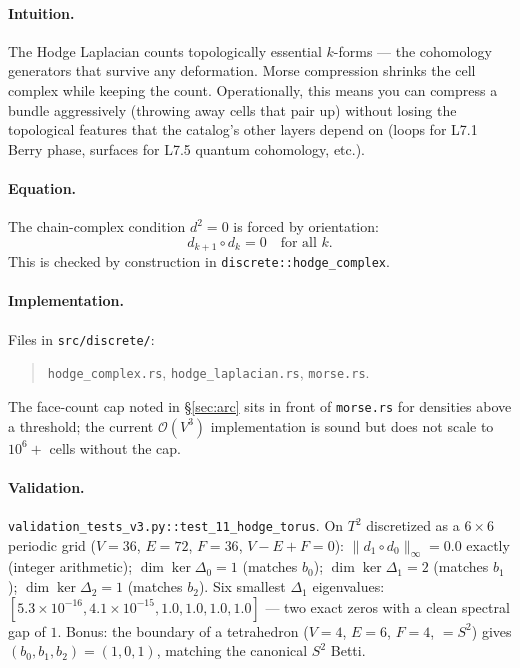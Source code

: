 \documentclass[11pt,letterpaper]{article}
\begin{document}
\paragraph{Intuition.}
The Hodge Laplacian counts topologically essential $k$-forms ---
the cohomology generators that survive any deformation. Morse
compression shrinks the cell complex while keeping the count.
Operationally, this means you can compress a bundle aggressively
(throwing away cells that pair up) without losing the topological
features that the catalog's other layers depend on (loops for L7.1
Berry phase, surfaces for L7.5 quantum cohomology, etc.).

\paragraph{Equation.}
The chain-complex condition $d^2 = 0$ is forced by orientation:
\[
d_{k+1} \circ d_k = 0 \quad \text{for all } k.
\]
This is checked by construction in
\texttt{discrete::hodge\_complex}.

\paragraph{Implementation.}
Files in \texttt{src/discrete/}:
\begin{quote}
\sloppy
\texttt{hodge\_complex.rs}, \texttt{hodge\_laplacian.rs},
\texttt{morse.rs}.
\end{quote}
The face-count cap noted in \S\ref{sec:arc} sits in front of
\texttt{morse.rs} for densities above a threshold; the current
$\mathcal{O}(V^3)$ implementation is sound but does not scale to
$10^6+$ cells without the cap.

\paragraph{Validation.}
\texttt{validation\_tests\_v3.py::test\_11\_hodge\_torus}. On
$T^2$ discretized as a $6 \times 6$ periodic grid ($V = 36$, $E =
72$, $F = 36$, $V - E + F = 0$):
$\|d_1 \circ d_0\|_\infty = 0.0$ exactly (integer arithmetic);
$\dim \ker \Delta_0 = 1$ (matches $b_0$); $\dim \ker \Delta_1 = 2$
(matches $b_1$); $\dim \ker \Delta_2 = 1$ (matches $b_2$). Six
smallest $\Delta_1$ eigenvalues: $[5.3 \times 10^{-16}, 4.1 \times
10^{-15}, 1.0, 1.0, 1.0, 1.0]$ --- two exact zeros with a clean
spectral gap of $1$. Bonus: the boundary of a tetrahedron ($V = 4$,
$E = 6$, $F = 4$, $= S^2$) gives $(b_0, b_1, b_2) = (1, 0, 1)$,
matching the canonical $S^2$ Betti.
\end{document}
